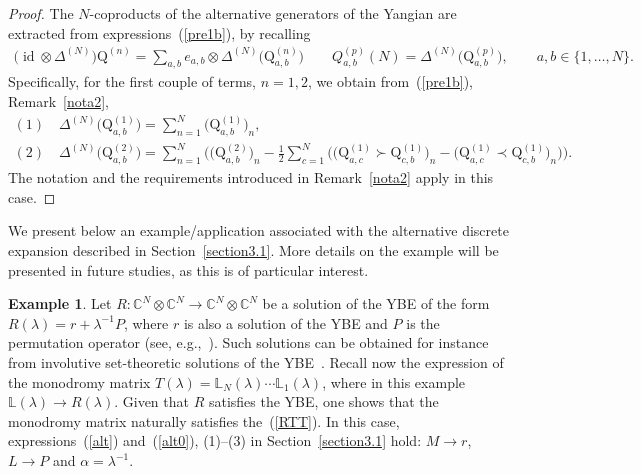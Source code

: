 \documentclass[10pt,a4paper]{amsart}
\numberwithin{equation}{section}
\theoremstyle{definition}
\newtheorem{exam}[thm]{Example}
\newcommand{\id}{\operatorname{id}}
\def\mathcal#1{#1}%
\begin{document}
\begin{proof}
The $N$-coproducts of the alternative generators  of the Yangian are extracted from expressions~(\ref{pre1b}), by recalling
\begin{gather*}
\bigl(\id \otimes \Delta^{(N)}\bigr){\mathrm Q}^{(n)}= \sum_{a, b} e_{a,b} \otimes \Delta^{(N)}\bigl({\mathrm Q}_{a,b}^{(n)}\bigr) \qquad {\mathcal Q}_{a,b}^{(p)}(N) = \Delta^{(N)}\bigl({\mathrm Q}_{a,b}^{(p)}\bigr),\qquad\!
a,b \in \{1, \dots, {\mathcal N}\}.
\end{gather*}
Specifically, for the first couple of terms, $n=1, 2$, we obtain from~(\ref{pre1b}), Remark~\ref{nota2},
\begin{gather*}
(1)\quad \Delta^{(N)}\bigl({\mathrm Q}^{(1)}_{a,b}\bigr) = \sum_{n=1}^N\bigl({\mathrm Q}^{(1)}_{a,b}\bigr)_n,\\
(2) \quad \Delta^{(N)}\bigl({\mathrm Q}^{(2)}_{a,b}\bigr) = \sum_{n=1}^N \bigl( \bigl( {\mathrm Q}^{(2)}_{a,b}\bigr)_n -
\frac{1}{2} \sum_{c =1}^{\mathcal N} \bigl( \bigl({\mathrm Q}^{(1)}_{a,c} \succ {\mathrm Q}^{(1)}_{c,b}\bigr)_n- \bigl({\mathrm Q}^{(1)}_{a,c} \prec {\mathrm Q}^{(1)}_{c,b}\bigr)_n \bigr)\bigr).
\end{gather*}
The notation and the requirements introduced in Remark~\ref{nota2} apply in this case.
\end{proof}


We present below an example/application associated with the alternative discrete expansion described in Section~\ref{section3.1}. More details on the example will be presented in future studies, as this is of particular interest.
\begin{exam}{\label{e1}} Let $R\colon {\mathbb C}^{\mathcal N} \otimes {\mathbb C}^{\mathcal N} \to {\mathbb C}^{\mathcal N} \otimes {\mathbb C}^{\mathcal N} $ be a solution of the YBE of the form $R(\lambda) = r + \lambda^{-1} {\mathcal P}$, where $r$ is also a solution of the YBE and $ {\mathcal P}$ is the permutation operator (see, e.g.,~\cite{Doikoutw, DoiSmo2, DoiSmo1}). Such solutions can be obtained for instance from involutive set-theoretic solutions of the YBE~\cite{DoiSmo1, Drin}. Recall now the expression of the monodromy matrix $T(\lambda) = {\mathbb L}_N(\lambda) \cdots {\mathbb L}_1(\lambda)$, where in this example ${\mathbb L}(\lambda) \to R(\lambda)$. Given that $R$ satisfies the YBE, one shows that the monodromy matrix naturally satisfies the~(\ref{RTT}). In this case, expressions~(\ref{alt}) and~(\ref{alt0}), (1)--(3) in Section~\ref{section3.1} hold: $M \to r$, $L \to {\mathcal P}$ and $\alpha = \lambda^{-1}$.
\end{exam}
\end{document}
